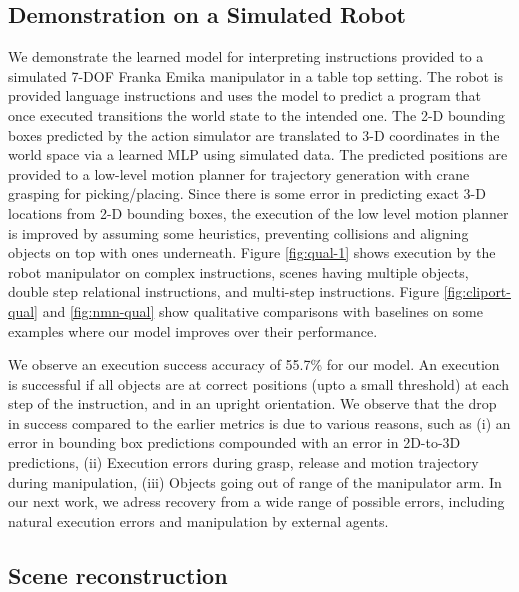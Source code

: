 \subsection{Demonstration on a Simulated Robot}
%
We demonstrate the learned model for interpreting instructions 
provided to a simulated 7-DOF Franka Emika manipulator in a table top setting. 
%
The robot is provided language instructions and uses the model to predict a program that once executed transitions the world state to the intended one. The 2-D bounding boxes predicted by the action simulator are translated to 3-D coordinates in the world space via a learned MLP using simulated data.
%
The predicted positions are provided to a low-level motion planner for trajectory generation with crane grasping for picking/placing. Since there is some error in predicting exact 3-D locations from 2-D bounding boxes, the execution of the low level motion planner is improved by assuming some heuristics, preventing collisions and aligning objects on top with ones underneath.  
% 
Figure \ref{fig:qual-1} shows execution by the robot manipulator on complex instructions, scenes having multiple objects, double step relational instructions, and multi-step instructions. 
%
Figure \ref{fig:cliport-qual} and \ref{fig:nmn-qual} show qualitative comparisons with baselines on some examples where our model improves over their performance.

We observe an execution success accuracy of 55.7\% for our model. An execution is successful if all objects are at correct positions (upto a small threshold) at each step of the instruction, and in an upright orientation. We observe that the drop in success compared to the earlier metrics is due to various reasons, such as (i) an error in bounding box predictions compounded with an error in 2D-to-3D predictions, (ii) Execution errors during grasp, release and motion trajectory during manipulation, (iii) Objects going out of range of the manipulator arm. In our next work, we adress recovery from a wide range of possible errors, including natural execution errors and manipulation by external agents. 


\subsection{Scene reconstruction}

